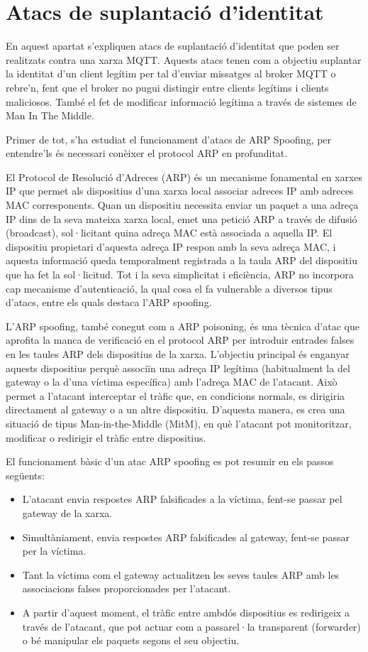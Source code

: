 \section{Atacs de suplantació d'identitat}

En aquest apartat s'expliquen atacs de suplantació d'identitat que poden ser realitzats contra una xarxa MQTT. Aquests atacs tenen com a objectiu suplantar la identitat d'un client legítim per tal d'enviar missatges al broker MQTT o rebre'n, fent que el broker no pugui distingir entre clients legítims i clients maliciosos. També el fet de modificar informació legítima a través de sistemes de Man In The Middle. 

Primer de tot, s'ha estudiat el funcionament d'atacs de ARP Spoofing, per entendre'ls és necessari conèixer el protocol ARP en profunditat.

El Protocol de Resolució d'Adreces (ARP) és un mecanisme fonamental en xarxes IP que permet als dispositius d'una xarxa local associar adreces IP amb adreces MAC corresponents. Quan un dispositiu necessita enviar un paquet a una adreça IP dins de la seva mateixa xarxa local, emet una petició ARP a través de difusió (broadcast), sol·licitant quina adreça MAC està associada a aquella IP. El dispositiu propietari d’aquesta adreça IP respon amb la seva adreça MAC, i aquesta informació queda temporalment registrada a la taula ARP del dispositiu que ha fet la sol·licitud. Tot i la seva simplicitat i eficiència, ARP no incorpora cap mecanisme d'autenticació, la qual cosa el fa vulnerable a diversos tipus d’atacs, entre els quals destaca l’ARP spoofing.

L’ARP spoofing, també conegut com a ARP poisoning, és una tècnica d’atac que aprofita la manca de verificació en el protocol ARP per introduir entrades falses en les taules ARP dels dispositius de la xarxa. L’objectiu principal és enganyar aquests dispositius perquè associïn una adreça IP legítima (habitualment la del gateway o la d’una víctima específica) amb l’adreça MAC de l’atacant. Això permet a l’atacant interceptar el tràfic que, en condicions normals, es dirigiria directament al gateway o a un altre dispositiu. D’aquesta manera, es crea una situació de tipus Man-in-the-Middle (MitM), en què l’atacant pot monitoritzar, modificar o redirigir el tràfic entre dispositius.


El funcionament bàsic d’un atac ARP spoofing es pot resumir en els passos següents:

\begin{itemize}
    \item L’atacant envia respostes ARP falsificades a la víctima, fent-se passar pel gateway de la xarxa.
    \item Simultàniament, envia respostes ARP falsificades al gateway, fent-se passar per la víctima.
    \item Tant la víctima com el gateway actualitzen les seves taules ARP amb les associacions falses proporcionades per l’atacant.
    \item A partir d’aquest moment, el tràfic entre ambdós dispositius es redirigeix a través de l’atacant, que pot actuar com a passarel·la transparent (forwarder) o bé manipular els paquets segons el seu objectiu.
\end{itemize}

